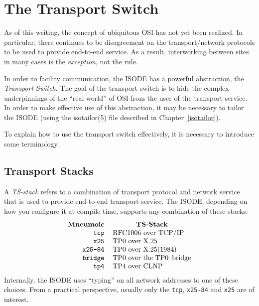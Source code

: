 
\chapter	{The Transport Switch}\label{tswitch}
As of this writing,
the concept of ubiquitous OSI has not yet been realized.
In particular,
there continues to be disagreement on the transport/network protocols to be
used to provide end-to-end service.
As a result,
interworking between sites in many cases is the {\em exception},
not the rule.

In order to facility communication,
the ISODE has a powerful abstraction,
the {\em Transport Switch}.
The goal of the transport switch is to hide the complex underpinnings of the
``real world'' of OSI from the user of the transport service.
In order to make effective use of this abstraction,
it may be necessary to tailor the ISODE
(using the \man isotailor(5) file described in Chapter~\ref{isotailor}).

To explain how to use the transport switch effectively,
it is necessary to introduce some terminology.

\section	{Transport Stacks}
A {\em TS-stack\/} refers to a combination of transport protocol and network
service that is used to provide end-to-end transport service.
The ISODE, depending on how you configure it at compile-time,
supports any combination of these stacks: 
\[\begin{tabular}{rl}
\multicolumn{1}{c}{\bf Mneumoic}&
		\multicolumn{1}{c}{\bf TS-Stack}\\
\verb"tcp"&	RFC1006 over TCP/IP\\
\verb"x25"&	TP0 over X.25\\
\verb"x25-84"&	TP0 over X.25(1984)\\
\verb"bridge"&	TP0 over the TP0--bridge\\
\verb"tp4"&	TP4 over CLNP
\end{tabular}\]
Internally,
the ISODE uses ``typing'' on all network addresses to one of these choices.
From a practical perspective,
usually only the \verb"tcp", \verb"x25-84" and \verb"x25" are of interest.

